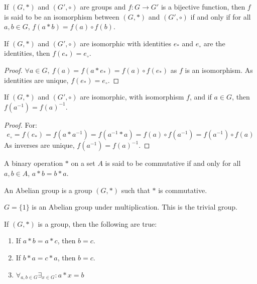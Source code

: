     \begin{definition}
        If $(G,*)$ and $(G',\circ)$ are groups and
        $f:G\rightarrow G'$ is a bijective function, then $f$ is said to
        be an isomorphism between $(G,*)$ and $(G',\circ)$ if and only if
        for all $a,b\in{G}$, $f(a*b)=f(a)\circ{f}(b)$.
    \end{definition}
    \begin{theorem}
        If $(G,*)$ and $(G',\circ)$ are isomorphic with identities $e_{*}$
        and $e_{\circ}$ are the identities, then $f(e_{*})=e_{\circ}$.
    \end{theorem}
    \begin{proof}
        $\forall a\in G,\ f(a)=f(a* e_*) = f(a)\circ f(e_*)$ as $f$ is
        an isomorphism. As identities are unique, $f(e_*)=e_{\circ}$.
    \end{proof}
    \begin{theorem}
        If $(G,*)$ and $(G',\circ)$ are isomorphic, with isomorphism $f$, and if
        $a\in{G}$, then $f(a^{\minus{1}})=f(a)^{\minus{1}}$.
    \end{theorem}
    \begin{proof}
        For:
        \begin{equation}
            e_{\circ}=f(e_*)
                     =f(a*a^{-1})
                     =f(a^{-1}*a)
                     =f(a)\circ f(a^{-1})
                     =f(a^{-1})\circ f(a)
        \end{equation}
        As inverses are unique, $f(a^{-1})=f(a)^{-1}$.
    \end{proof}
    \begin{definition}
    A binary operation $*$ on a set $A$ is said to be commutative if and only for all $a,b\in A$, $a*b = b*a$.
    \end{definition}
    \begin{definition}
        An Abelian group is a group $(G,*)$ such that
        $*$ is commutative.
    \end{definition}
    \begin{example}
        $G=\{1\}$ is an Abelian group under multiplication.
        This is the trivial group.
    \end{example}
    \begin{theorem}
        If $(G,*)$ is a group, then the following are true:
        \begin{enumerate}
            \item If $a*b=a*c$, then $b=c$.
            \item If $b*a=c*a$, then $b=c$.
            \item $\forall_{{a,b}\in{G}}\exists_{{x}\in{G}}:a*x=b$
        \end{enumerate}
    \end{theorem}
